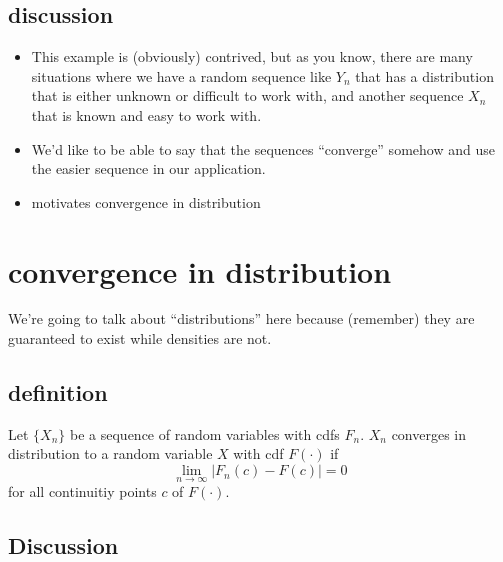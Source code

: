 \subsection{discussion}

\begin{itemize}
\item This example is (obviously) contrived, but as you know, there are
       many situations where we have a random sequence like $Y_n$ that
       has a distribution that is either unknown or difficult to work
       with, and another sequence $X_n$ that is known and easy to work
       with.
\item We'd like to be able to say that the sequences ``converge'' somehow
       and use the easier sequence in our application.
\item motivates convergence in distribution
\end{itemize}

\section{convergence in distribution}

    We're going to talk about ``distributions'' here because (remember)
    they are guaranteed to exist while densities are not.

\subsection{definition}

     Let $\{X_n\}$ be a sequence of random variables with cdfs $F_n$.
     $X_n$ converges in distribution to a random variable $X$ with cdf
     $F(\cdot)$ if $$\lim_{n\to\infty} \lvert F_n(c) - F(c) \rvert = 0$$
     for all continuitiy points $c$ of $F(\cdot)$.

\subsection{Discussion}

